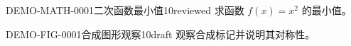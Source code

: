 \begin{qbankquestion}{DEMO-MATH-0001}{二次函数最小值}{10}{reviewed}
求函数 \(f(x)=x^2\) 的最小值。
\end{qbankquestion}

\begin{qbankquestion}{DEMO-FIG-0001}{合成图形观察}{10}{draft}
观察合成标记并说明其对称性。
\end{qbankquestion}
